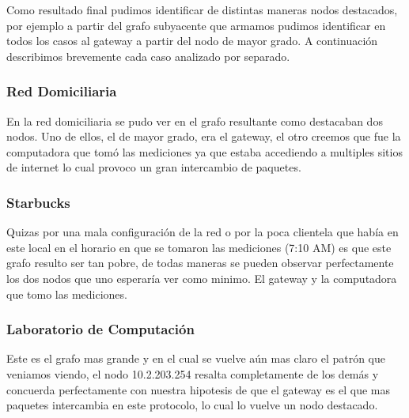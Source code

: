 
Como resultado final pudimos identificar de distintas maneras nodos destacados, por ejemplo a partir del grafo subyacente que armamos pudimos identificar en todos los casos al gateway a partir del nodo de mayor grado. A continuación describimos brevemente cada caso analizado por separado.

\subsubsection{Red Domiciliaria}

En la red domiciliaria se pudo ver en el grafo resultante como destacaban dos nodos. Uno de ellos, el de mayor grado, era el gateway, el otro creemos que fue la computadora que tomó las mediciones ya que estaba accediendo a multiples sitios de internet lo cual provoco un gran intercambio de paquetes.

\subsubsection{Starbucks}

Quizas por una mala configuración de la red o por la poca clientela que había en este local en el horario en que se tomaron las mediciones (7:10 AM) es que este grafo resulto ser tan pobre, de todas maneras se pueden observar perfectamente los dos nodos que uno esperaría ver como minimo. El gateway y la computadora que tomo las mediciones.

\subsubsection{Laboratorio de Computación}

Este es el grafo mas grande y en el cual se vuelve aún mas claro el patrón que veniamos viendo, el nodo 10.2.203.254 resalta completamente de los demás y concuerda perfectamente con nuestra hipotesis de que el gateway es el que mas paquetes intercambia en este protocolo, lo cual lo vuelve un nodo destacado.
